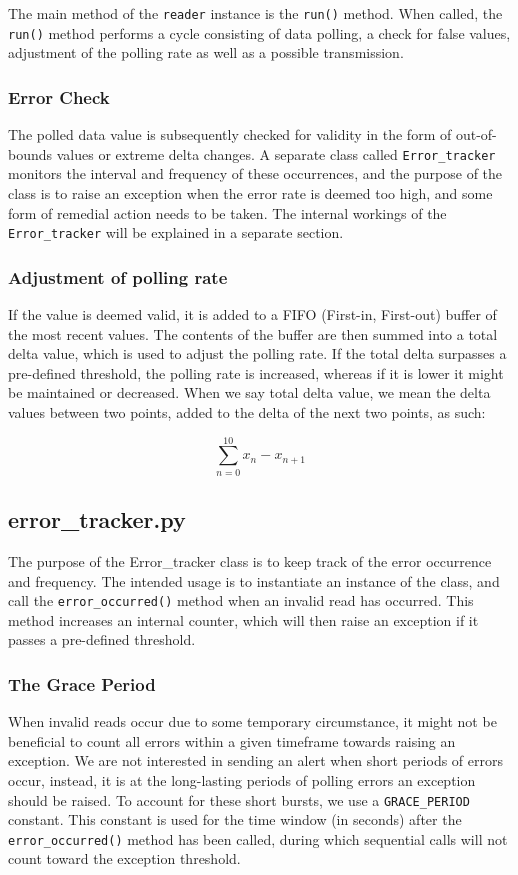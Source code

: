 The main method of the \lstinline{reader} instance is the \lstinline{run()} method. When called, the \lstinline{run()} method performs a cycle consisting of data polling, a check for false values, adjustment of the polling rate as well as a possible transmission. 

\subsubsection{Error Check}
The polled data value is subsequently checked for validity in the form of out-of-bounds values or extreme delta changes. A separate class called \lstinline{Error_tracker} monitors the interval and frequency of these occurrences, and the purpose of the class is to raise an exception when the error rate is deemed too high, and some form of remedial action needs to be taken. The internal workings of the \lstinline{Error_tracker} will be explained in a separate section.

\subsubsection{Adjustment of polling rate}
If the value is deemed valid, it is added to a FIFO (First-in, First-out) buffer of the most recent values. The contents of the buffer are then summed into a total delta value, which is used to adjust the polling rate. If the total delta surpasses a pre-defined threshold, the polling rate is increased, whereas if it is lower it might be maintained or decreased. When we say total delta value, we mean the delta values between two points, added to the delta of the next two points, as such:

$$\sum_{n=0}^{10} x_n - x_{n+1}$$


\subsection{error\_tracker.py}
The purpose of the Error\_tracker class is to keep track of the error occurrence and frequency. The intended usage is to instantiate an instance of the class, and call the \lstinline{error_occurred()} method when an invalid read has occurred. This method increases an internal counter, which will then raise an exception if it passes a pre-defined threshold.

\subsubsection{The Grace Period}
When invalid reads occur due to some temporary circumstance, it might not be beneficial to count all errors within a given timeframe towards raising an exception. We are not interested in sending an alert when short periods of errors occur, instead, it is at the long-lasting periods of polling errors an exception should be raised. To account for these short bursts, we use a \lstinline{GRACE_PERIOD} constant. This constant is used for the time window (in seconds) after the \lstinline{error_occurred()} method has been called, during which sequential calls  will not count toward the exception threshold.

